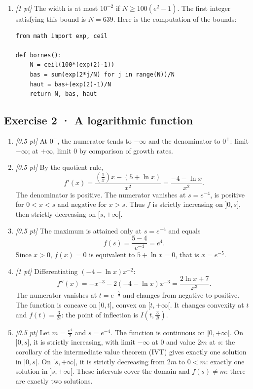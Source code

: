 \begin{enumerate}

\item \textit{[1 pt]} The width is at most $10^{-2}$ if $N\ge100(e^{2}-1)$. The first integer satisfying this bound is $N=639$. Here is the computation of the bounds:
\begin{lstlisting}
from math import exp, ceil

def bornes():
    N = ceil(100*(exp(2)-1))
    bas = sum(exp(2*j/N) for j in range(N))/N
    haut = bas+(exp(2)-1)/N
    return N, bas, haut
\end{lstlisting}


\end{enumerate}

\subsection*{Exercise 2 · A logarithmic function}\begin{enumerate}

\item \textit{[0.5 pt]} At $0^+$, the numerator tends to $-\infty$ and the denominator to $0^+$: limit $-\infty$; at $+\infty$, limit $0$ by comparison of growth rates.

\item \textit{[0.5 pt]} By the quotient rule,
\[f'(x)=\frac{(\frac{1}{x})x-(5+\ln x)}{x^2}=\frac{-4-\ln x}{x^2}.\]
The denominator is positive. The numerator vanishes at $s=e^{-4}$, is positive for $0<x<s$ and negative for $x>s$. Thus $f$ is strictly increasing on $]0,s]$, then strictly decreasing on $[s,+\infty[$.

\item \textit{[0.5 pt]} The maximum is attained only at $s=e^{-4}$ and equals
\[f(s)=\frac{5- 4}{e^{-4}}=e^{4}.\]
Since $x>0$, $f(x)=0$ is equivalent to $5+\ln x=0$, that is $x=e^{-5}$.

\item \textit{[1 pt]} Differentiating $(-4-\ln x)x^{-2}$:
\[f''(x)=-x^{-3}-2(-4-\ln x)x^{-3}=\frac{2\ln x+7}{x^3}.\]
The numerator vanishes at $t=e^{-\frac{7}{2}}$ and changes from negative to positive. The function is concave on $]0,t]$, convex on $[t,+\infty[$. It changes convexity at $t$ and $f(t)=\frac{3}{2t}$: the point of inflection is $I(t,\frac{3}{2t})$.

\item \textit{[0.5 pt]} Let $m=\frac{e^{4}}{2}$ and $s=e^{-4}$. The function is continuous on $]0,+\infty[$. On $]0,s]$, it is strictly increasing, with limit $-\infty$ at $0$ and value $2m$ at $s$: the corollary of the intermediate value theorem (IVT) gives exactly one solution in $]0,s[$. On $[s,+\infty[$, it is strictly decreasing from $2m$ to $0<m$: exactly one solution in $]s,+\infty[$. These intervals cover the domain and $f(s)\ne m$: there are exactly two solutions.


\end{enumerate}
